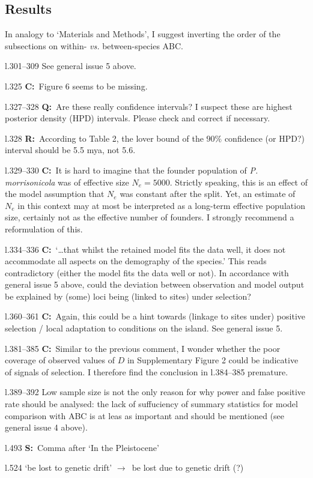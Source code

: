 \documentclass[11pt]{article}
\newenvironment{my_description}
{\begin{description}
  \setlength{\itemsep}{2pt}
  \setlength{\parskip}{0pt}
  \setlength{\parsep}{0pt}}
{\end{description}}
\newcommand{\ra}{$\rightarrow$\ }
\newcommand{\C}{\textbf{C:}\ }
\newcommand{\Q}{\textbf{Q:}\ }
\newcommand{\R}{\textbf{R:}\ }
\newcommand{\V}{\textbf{S:}\ }
\begin{document}
\subsection{Results}
In analogy to `Materials and Methods', I suggest inverting the order of the subsections on within- \emph{vs.} between-species ABC.
\begin{my_description}
	\item[l.301--309] See general issue 5 above.
	\item[l.325] \C Figure 6 seems to be missing.
	\item[l.327--328] \Q Are these really confidence intervals? I suspect these are highest posterior density (HPD) intervals. Please check and correct if necessary.
	\item[l.328] \R According to Table 2, the lover bound of the $90\%$ confidence (or HPD?) interval should be 5.5 mya, not 5.6.
	\item[l.329--330] \C It is hard to imagine that the founder population of \emph{P. morrisonicola} was of effective size $N_e = 5000$. Strictly speaking, this is an effect of the model assumption that $N_e$ was constant after the split. Yet, an estimate of $N_e$ in this context may at most be interpreted as a long-term effective population size, certainly not as the effective number of founders. I strongly recommend a reformulation of this.
	\item[l.334--336] \C `\dots that whilst the retained model fits the data well, it does not accommodate all aspects on the demography of the species.' This reads contradictory (either the model fits the data well or not). In accordance with general issue 5 above, could the deviation between observation and model output be explained by (some) loci being (linked to sites) under selection?
	\item[l.360--361] \C Again, this could be a hint towards (linkage to sites under) positive selection / local adaptation to conditions on the island. See general issue 5.
	\item[l.381--385] \C Similar to the previous comment, I wonder whether the poor coverage of observed values of $D$ in Supplementary Figure 2 could be indicative of signals of selection. I therefore find the conclusion in l.384--385 premature.
	\item[l.389--392] Low sample size is not the only reason for why power and false positive rate should be analysed: the lack of suffuciency of summary statistics for model comparison with ABC is at leas as important and should be mentioned (see general issue 4 above).
	\item[l.493] \V Comma after `In the Pleistocene'
	\item[l.524] `be lost to genetic drift' \ra be lost due to genetic drift (?)
\end{my_description}
\end{document}

